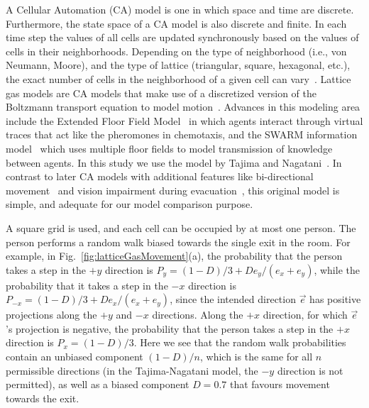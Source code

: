 A Cellular Automation (CA) model is one in which space and time are discrete. Furthermore, the state space of a CA model is also discrete and finite. In each time step the values of all cells are updated synchronously based on the values of cells in their neighborhoods. Depending on the type of neighborhood (i.e., von Neumann, Moore), and the type of lattice (triangular, square, hexagonal, etc.), the exact number of cells in the neighborhood of a given cell can vary~\cite{Hoekstra:2010}.
Lattice gas models are CA models that make use of a discretized version of the Boltzmann transport equation to model motion~\cite{Marconi:2002ue,Marconi2002,Nagai:2004kl}. Advances in this modeling area include the Extended Floor Field Model~\cite{nishinari2004extended} in which agents interact through virtual traces that act like the pheromones in chemotaxis, and the SWARM information model~\cite{Henein:2006jq} which uses multiple floor fields to model transmission of knowledge between agents.
In this study we use the model by Tajima and Nagatani~\cite{Tajima:2001to}. In contrast to later CA models with additional features like bi-directional movement~\cite{isobe2004experiment} and vision impairment during evacuation~\cite{Nagai:2004kl}, this original model is simple, and adequate for our model comparison purpose.

A square grid is used, and each cell
can be occupied by at most one person. The person performs a random walk biased towards the single exit in the room. For example, in Fig.~\ref{fig:latticeGasMovement}(a), the probability that the person takes a step in the $+y$ direction is $P_y = (1 - D)/3 + D e_y /(e_x + e_y)$, while the probability that it takes a step in the $-x$ direction is $P_{-x} = (1 - D)/3 + D e_x /(e_x + e_y)$, since the intended direction $\vec{e}$ has positive projections along the $+y$ and $-x$ directions. Along the $+x$ direction, for which $\vec{e}$'s projection is negative, the probability that the person takes a step in the $+x$ direction is $P_x = (1 - D)/3$. Here we see that the random walk probabilities contain an unbiased component $(1 - D)/n$, which is the same for all $n$ permissible directions (in the Tajima-Nagatani model, the $-y$ direction is not permitted), as well as a biased component $D = 0.7$ that favours movement towards the exit.

